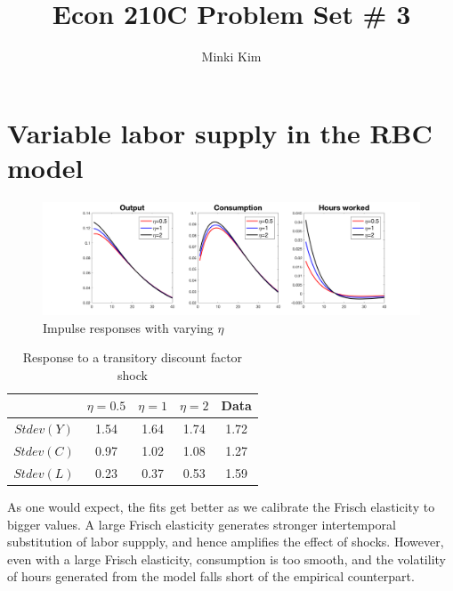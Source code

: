 \documentclass[11pt]{amsart}
\title{Econ 210C Problem Set \# 3}
\author{Minki Kim}
\begin{document}
\maketitle

\section{Variable labor supply in the RBC model}
\begin{figure}[H]
	\centering
	\includegraphics[width=\textwidth]{Q1}
	\caption{Impulse responses with varying $\eta$}
\end{figure}

\begin{table}[H]
	\centering
	\begin{tabular}{ccccc}
		\hline \hline 
		& $\eta=0.5$  & $\eta = 1$          & $\eta = 2$ & Data  \\
		\hline 
		$Stdev(Y)$ &  1.54    & 1.64    & 1.74    & 1.72     \\
		$Stdev(C)$ &  0.97    & 1.02   & 1.08       & 1.27 \\
		$Stdev(L)$ &   0.23   &  0.37   & 0.53     &  1.59 \\
		\hline
	\end{tabular}
	\caption{Response to a transitory discount factor shock}
\end{table}
As one would expect, the fits get better as we calibrate the Frisch elasticity to bigger values. A large Frisch elasticity generates stronger intertemporal substitution of labor suppply, and hence amplifies the effect of shocks. However, even with a large Frisch elasticity, consumption is too smooth, and the volatility of hours generated from the model falls short of the empirical counterpart. 
\end{document}
